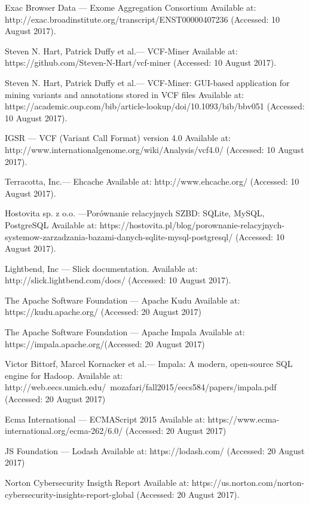 \documentclass[a4paper,12pt,twoside]{article}
\begin{document}
\begin{thebibliography}{99}
Exac Browser Data — Exome Aggregation Consortium
Available at: http://exac.broadinstitute.org/transcript/ENST00000407236 (Accessed: 10 August 2017).

Steven N. Hart, Patrick Duffy et al.— VCF-Miner
Available at: https://github.com/Steven-N-Hart/vcf-miner (Accessed: 10 August 2017).

Steven N. Hart, Patrick Duffy et al.— VCF-Miner: GUI-based application for mining variants and annotations stored in VCF files
Available at: https://academic.oup.com/bib/article-lookup/doi/10.1093/bib/bbv051 (Accessed: 10 August 2017).

IGSR — VCF (Variant Call Format) version 4.0
Available at: http://www.internationalgenome.org/wiki/Analysis/vcf4.0/ (Accessed: 10 August 2017).

Terracotta, Inc.— Ehcache
Available at: http://www.ehcache.org/ (Accessed: 10 August 2017).

Hostovita sp. z o.o. —Porównanie relacyjnych SZBD: SQLite, MySQL, PostgreSQL
Available at:
https://hostovita.pl/blog/porownanie-relacyjnych-systemow-zarzadzania-bazami-danych-sqlite-mysql-postgresql/ (Accessed: 10 August 2017).

Lightbend, Inc — Slick documentation. Available at:
http://slick.lightbend.com/docs/ (Accessed: 10 August 2017).

The Apache Software Foundation — Apache Kudu Available at:
https://kudu.apache.org/ (Accessed: 20 August 2017)

The Apache Software Foundation — Apache Impala Available at:
https://impala.apache.org/(Accessed: 20 August 2017)

Victor Bittorf, Marcel Kornacker et al.— Impala: A modern, open-source SQL engine for Hadoop.
Available at: http://web.eecs.umich.edu/~mozafari/fall2015/eecs584/papers/impala.pdf (Accessed: 20 August 2017)

Ecma International — ECMAScript 2015
Available at: https://www.ecma-international.org/ecma-262/6.0/ (Accessed: 20 August 2017)

JS Foundation — Lodash
Available at: https://lodash.com/ (Accessed: 20 August 2017)

Norton Cybersecurity Insigth Report
Available at: https://us.norton.com/norton-cybersecurity-insights-report-global (Accessed: 20 August 2017).


\end{thebibliography}
\end{document}
